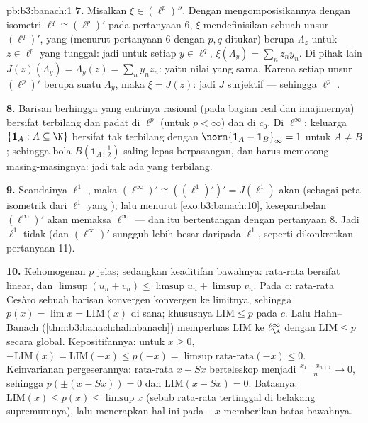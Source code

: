 \begin{solution}{pb:b3:banach:1}
\textbf{7.} Misalkan $\xi \in (\ell^p)''$. Dengan mengomposisikannya dengan
isometri $\ell^q \cong (\ell^p)'$ pada pertanyaan 6, $\xi$ mendefinisikan
sebuah unsur $(\ell^q)'$, yang (menurut pertanyaan 6 dengan $p, q$
ditukar) berupa $\Lambda_z$ untuk $z \in \ell^p$ yang tunggal: jadi untuk setiap
$y \in \ell^q$, $\xi(\Lambda_y) = \sum_nz_ny_n$. Di pihak
lain $J(z)(\Lambda_y) = \Lambda_y(z) = \sum_ny_nz_n$: yaitu nilai yang
sama. Karena setiap unsur $(\ell^p)'$ berupa suatu $\Lambda_y$, maka
$\xi = J(z)$: jadi $J$ surjektif --- sehingga $\ell^p$ .

\textbf{8.} Barisan berhingga yang entrinya rasional (pada bagian real dan
imajinernya) bersifat terbilang dan padat di $\ell^p$ (untuk $p < \infty$) dan
di $c_0$. Di $\ell^\infty$: keluarga $\{\mathbf 1_A : A
\subseteq \N\}$ bersifat tak terbilang dengan $\norm{\mathbf 1_A -
\mathbf 1_B}_\infty = 1$ untuk $A \neq B$; sehingga bola $B(\mathbf
1_A, \frac12)$ saling lepas berpasangan, dan  harus memotong
masing-masingnya: jadi tak ada  yang terbilang.

\textbf{9.} Seandainya $\ell^1$ , maka $(\ell^\infty)'
\cong ((\ell^1)')' = J(\ell^1)$ akan  (sebagai peta
isometrik dari $\ell^1$ yang ); lalu menurut
\cref{exo:b3:banach:10}, keseparabelan 
$(\ell^\infty)'$ akan memaksa $\ell^\infty$  ---
dan itu bertentangan dengan pertanyaan 8. Jadi $\ell^1$ tidak  (dan
$(\ell^\infty)'$ sungguh lebih besar daripada $\ell^1$, seperti dikonkretkan
pertanyaan 11).

\textbf{10.} Kehomogenan $p$ jelas; sedangkan keaditifan bawahnya:
rata-rata bersifat linear, dan $\limsup(u_n + v_n) \leq \limsup u_n +
\limsup v_n$. Pada $c$: rata-rata Cesàro sebuah barisan konvergen
konvergen ke limitnya, sehingga $p(x) = \lim x =
\mathrm{LIM}(x)$ di sana; khususnya $\mathrm{LIM} \leq p$ pada
$c$. Lalu Hahn--Banach (\cref{thm:b3:banach:hahnbanach}) memperluas
$\mathrm{LIM}$ ke $\ell^\infty_\R$ dengan $\mathrm{LIM} \leq p$
secara global. Kepositifannya: untuk $x \geq 0$, $-\mathrm{LIM}(x) =
\mathrm{LIM}(-x) \leq p(-x) = \limsup\text{rata-rata}(-x) \leq 0$.
Keinvarianan pergeserannya: rata-rata $x - Sx$ berteleskop menjadi
$\frac{x_1 - x_{n+1}}n \to 0$, sehingga $p(\pm(x - Sx)) = 0$ dan
$\mathrm{LIM}(x - Sx) = 0$. Batasnya: $\mathrm{LIM}(x) \leq p(x)
\leq \limsup x$ (sebab rata-rata tertinggal di belakang supremumnya), lalu menerapkan hal ini
pada $-x$ memberikan batas bawahnya.


\end{solution}
